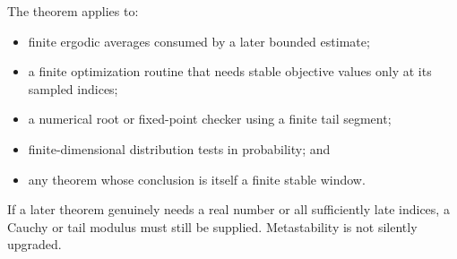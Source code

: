 The theorem applies to:
\begin{itemize}
\item finite ergodic averages consumed by a later bounded estimate;
\item a finite optimization routine that needs stable objective values only at
      its sampled indices;
\item a numerical root or fixed-point checker using a finite tail segment;
\item finite-dimensional distribution tests in probability; and
\item any theorem whose conclusion is itself a finite stable window.
\end{itemize}

If a later theorem genuinely needs a real number or all sufficiently late
indices, a Cauchy or tail modulus must still be supplied.  Metastability is not
silently upgraded.
